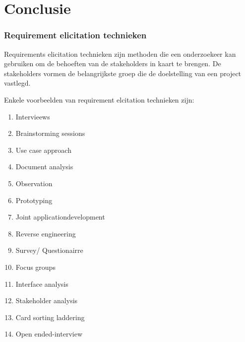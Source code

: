 \section{Conclusie}



\subsubsection{Requirement elicitation technieken}

Requirements elicitation technieken zijn methoden die een onderzoekeer kan gebruiken om de behoeften van de stakeholders in kaart te brengen. De stakeholders  vormen de belangrijkste groep die de doelstelling van een project vastlegd.

Enkele voorbeelden van requirement elcitation technieken zijn:


\begin{enumerate}
	\item  Intervieews
	\item  Brainstorming sessions 
	\item  Use case approach 
	\item  Document analysis 
	\item  Observation
	\item  Prototyping
	\item  Joint applicationdevelopment
	\item  Reverse engineering 
	\item  Survey/ Questionairre 
	\item  Focus groups 
	\item  Interface analysis
	\item  Stakeholder analysis 
	\item  Card sorting laddering 
	\item  Open ended-interview
\end{enumerate}






\usepackage{pgf}





